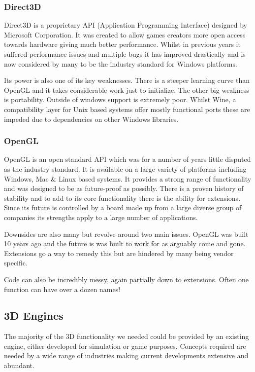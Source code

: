 \subsubsection{Direct3D}

Direct3D is a proprietary API (Application Programming Interface) designed
by Microsoft Corporation. It was created to allow games creators more
open access towards hardware giving much better performance. Whilst
in previous years it suffered performance issues and multiple bugs
it has improved drastically and is now considered by many to be the
industry standard for Windows platforms\cite{Roy2002}.

Its power is also one of its key weaknesses. There is a steeper learning
curve than OpenGL and it takes considerable work just to initialize.
The other big weakness is portability. Outside of windows support
is extremely poor. Whilst Wine, a compatibility layer for Unix based
systems offer mostly functional ports these are impeded due to dependencies
on other Windows libraries.


\subsubsection{OpenGL}

OpenGL is an open standard API which was for a number of years little
disputed as the industry standard. It is available on a large variety
of platforms including Windows, Mac \& Linux based systems. It provides
a strong range of functionality and was designed to be as future-proof
as possibly. There is a proven history of stability and to add to
its core functionality there is the ability for extensions. Since
its future is controlled by a board made up from a large diverse group
of companies its strengths apply to a large number of applications.

Downsides are also many but revolve around two main issues. OpenGL
was built 10 years ago and the future is was built to work for as
arguably come and gone. Extensions go a way to remedy this but are
hindered by many being vendor specific.

Code can also be incredibly messy, again partially down to extensions.
Often one function can have over a dozen names!


\subsection{3D Engines}

The majority of the 3D functionality we needed could be provided by
an existing engine, either developed for simulation or game purposes.
Concepts required are needed by a wide range of industries making
current developments extensive and abundant.

